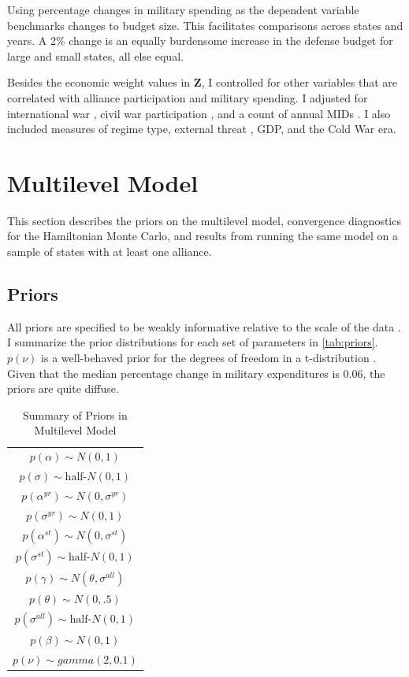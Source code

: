 \documentclass[12pt]{article}
\begin{document}
Using percentage changes in military spending as the dependent variable benchmarks changes to budget size. 
This facilitates comparisons across states and years. 
A 2\% change is an equally burdensome increase in the defense budget for large and small states, all else equal. 


Besides the economic weight values in \textbf{Z}, I controlled for other variables that are correlated with alliance participation and military spending. 
I adjusted for international war \citep{Reiteretal2016}, civil war participation \citep{SarkeesWayman2010}, and a count of annual MIDs \citep{Gibleretal2016}. 
I also included measures of regime type, external threat \citep{LeedsSavun2007}, GDP, and the Cold War era. 

 


\section{Multilevel Model}

This section describes the priors on the multilevel model, convergence diagnostics for the Hamiltonian Monte Carlo, and results from running the same model on a sample of states with at least one alliance. 


\subsection{Priors} 

All priors are specified to be weakly informative relative to the scale of the data \citep{Gelmanetal2017}. 
I summarize the prior distributions for each set of parameters in \autoref{tab:priors}. 
$p(\nu)$ is a well-behaved prior for the degrees of freedom in a t-distribution \citep{JuarezSteele2010}. 
Given that the median percentage change in military expenditures is 0.06, the priors are quite diffuse. 


\begin{table} %
\begin{center}
\begin{tabular}{c} 
$ p(\alpha) \sim N(0, 1)$  \\
$ p(\sigma) \sim \mbox{half-}N(0, 1) $ \\
$ p(\alpha^{yr}) \sim N(0, \sigma^{yr}) $ \\ 
$ p(\sigma^{yr}) \sim N(0, 1) $ \\
$ p(\alpha^{st}) \sim N(0, \sigma^{st}) $ \\ 
$ p(\sigma^{st}) \sim \mbox{half-}N(0, 1) $ \\ 
$ p(\gamma) \sim N(\theta, \sigma^{all}) $ \\ 
$ p(\theta) \sim N(0, .5) $ \\
$ p(\sigma^{all}) \sim \mbox{half-}N(0, 1) $ \\
$ p(\beta) \sim N(0, 1) $ \\
$ p(\nu) \sim gamma(2, 0.1)$ 
\end{tabular} 
\caption{Summary of Priors in Multilevel Model} 
\label{tab:priors}
\end{center} 
\end{table} 
\end{document}

